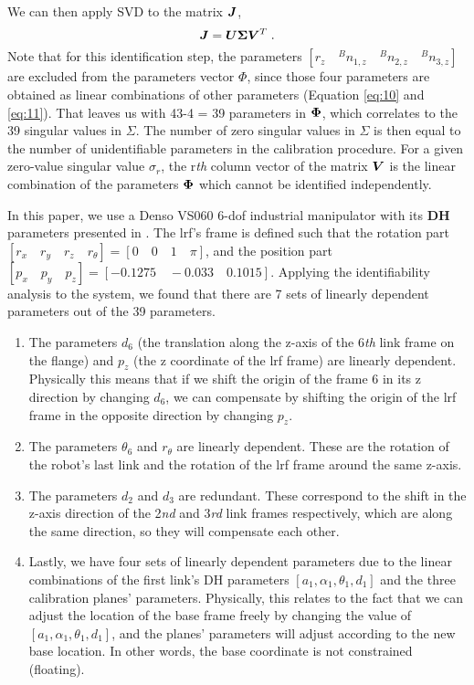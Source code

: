 We can then apply SVD to the matrix $\vb*{J}$,
\begin{equation}
 \vb*{J} = \vb*{U}\vb*{\Sigma}\vb*{V}^T \; .
\end{equation}
Note that for this identification step, the parameters $[r_z \quad {^B}n_{1,z}\quad {^B}n_{2,z}\quad {^B}n_{3,z}]$ are excluded from the parameters vector $\Phi$, since those four parameters are obtained as linear combinations of other parameters (Equation \eqref{eq:10} and \eqref{eq:11}). That leaves us with 43-4 = 39 parameters in $\vb*{\Phi}$, which correlates to the 39 singular values in $\Sigma$. The number of zero singular values in $\Sigma$ is then equal to the number of unidentifiable parameters in the calibration procedure. For a given zero-value singular value $\sigma_r$, the r\textit{th} column vector of the matrix $\vb*{V}$ is the linear combination of the parameters $\vb*{\Phi}$ which cannot be identified independently. 

In this paper, we use a Denso VS060 6-\ac{dof} industrial manipulator with its \textbf{DH} parameters presented in . The \ac{lrf}'s frame is defined such that the rotation part $[r_x \quad r_y \quad r_z \quad r_{\theta}] = [0 \quad 0 \quad 1 \quad \pi]$, and the position part $[p_x \quad p_y\quad p_z] = [-0.1275 \quad -0.033 \quad 0.1015]$. Applying the identifiability analysis to the system, we found that there are 7 sets of linearly dependent parameters out of the 39 parameters. 
\begin{enumerate}
\item The parameters $d_6$ (the translation along the z-axis of the 6\textit{th} link frame on the flange) and $p_z$ (the z coordinate of the \ac{lrf} frame) are linearly dependent. Physically this means that if we shift the origin of the frame 6 in its z direction by changing $d_6$, we can compensate by shifting the origin of the \ac{lrf} frame in the opposite direction by changing $p_z$.
\item The parameters $\theta_6$ and $r_\theta$ are linearly dependent. These are the rotation of the robot's last link and the rotation of the \ac{lrf} frame around the same z-axis. 
\item The parameters $d_2$ and $d_3$ are redundant. These correspond to the shift in the z-axis direction of the 2\textit{nd} and 3\textit{rd} link frames respectively, which are along the same direction, so they will compensate each other. 
\item Lastly, we have four sets of linearly dependent parameters due to the linear combinations of the first link's DH parameters $[a_1, \alpha_1, \theta_1, d_1 ]$ and the three calibration planes' parameters. Physically, this relates to the fact that we can adjust the location of the base frame freely by changing the value of $[a_1, \alpha_1, \theta_1, d_1]$, and the planes' parameters will adjust according to the new base location. In other words, the base coordinate is not constrained (floating). 
\end{enumerate}


